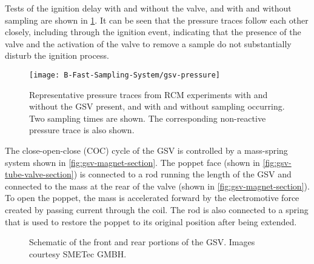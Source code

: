 \documentclass[../main.tex]{subfiles}
\begin{document}
Tests of the ignition delay with and without the valve, and with and
without sampling are shown in \cref{fig:gsv-pressure}. It can be seen
that the pressure traces follow each other closely, including through the
ignition event, indicating that the presence of the valve and the
activation of the valve to remove a sample do not substantially disturb
the ignition process.

\begin{figure}
\texttt{[image: B-Fast-Sampling-System/gsv-pressure]}
\caption{Representative pressure traces from RCM experiments with and
without the GSV present, and with and without sampling occurring. Two
sampling times are shown. The corresponding non-reactive pressure trace
is also shown.}
\label{fig:gsv-pressure}
\end{figure}

The close-open-close (COC) cycle of the GSV is controlled by a
mass-spring system shown in \cref{fig:gsv-magnet-section}. The poppet
face (shown in \cref{fig:gsv-tube-valve-section}) is connected to a rod
running the length of the GSV and connected to the mass at the rear
of the valve (shown in \cref{fig:gsv-magnet-section}). To open the
poppet, the mass is accelerated forward by the electromotive force
created by passing current through the coil. The rod is also connected
to a spring that is used to restore the poppet to its original position
after being extended.

\begin{figure}
        {\caption{Schematic of the front and rear portions of the GSV. Images courtesy
        SMETec GMBH.}
        \label{fig:gsv-schematic}}
\end{figure}
\end{document}
